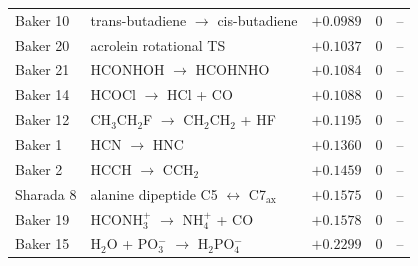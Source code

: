 \begin{table}[h]
{\begin{tabular}{@{}llrcr@{}}
Baker 10  & trans-butadiene $\rightarrow$ cis-butadiene            & $+0.0989$ & 0 & -- \\
Baker 20  & acrolein rotational TS                                 & $+0.1037$ & 0 & -- \\
Baker 21  & HCONHOH $\rightarrow$ HCOHNHO                          & $+0.1084$ & 0 & -- \\
Baker 14  & HCOCl $\rightarrow$ HCl + CO                           & $+0.1088$ & 0 & -- \\
Baker 12  & CH$_3$CH$_2$F $\rightarrow$ CH$_2$CH$_2$ + HF           & $+0.1195$ & 0 & -- \\
Baker 1   & HCN $\rightarrow$ HNC                                  & $+0.1360$ & 0 & -- \\
Baker 2   & HCCH $\rightarrow$ CCH$_2$                             & $+0.1459$ & 0 & -- \\
Sharada 8 & alanine dipeptide C5 $\leftrightarrow$ C7$_\mathrm{ax}$ & $+0.1575$ & 0 & -- \\
Baker 19  & HCONH$_3^+$ $\rightarrow$ NH$_4^+$ + CO                & $+0.1578$ & 0 & -- \\
Baker 15  & H$_2$O + PO$_3^-$ $\rightarrow$ H$_2$PO$_4^-$          & $+0.2299$ & 0 & -- \\
\bottomrule
\end{tabular}}
\end{table}
